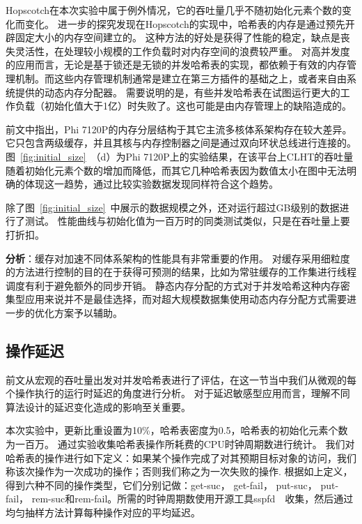 Hopscotch在本次实验中属于例外情况，它的吞吐量几乎不随初始化元素个数的变化而变化。
进一步的探究发现在Hopscotch的实现中，哈希表的内存是通过预先开辟固定大小的内存空间建立的。
这种方法的好处是获得了性能的稳定，缺点是丧失灵活性，在处理较小规模的工作负载时对内存空间的浪费较严重。
对高并发度的应用而言，无论是基于锁还是无锁的并发哈希表的实现，都依赖于有效的内存管理机制。而这些内存管理机制通常是建立在第三方插件的基础之上，或者来自由系统提供的动态内存分配器。
需要说明的是，有些并发哈希表在试图运行更大的工作负载（初始化值大于1亿）时失败了。这也可能是由内存管理上的缺陷造成的。

前文中指出，Phi 7120P的内存分层结构于其它主流多核体系架构存在较大差异。
它只包含两级缓存，并且其核与内存控制器之间是通过双向环状总线进行连接的。图~\ref{fig:initial_size}~（d）为Phi 7120P上的实验结果，在该平台上CLHT的吞吐量随着初始化元素个数的增加而降低，而其它几种哈希表因为数值太小在图中无法明确的体现这一趋势，通过比较实验数据发现同样符合这个趋势。

除了图~\ref{fig:initial_size}~中展示的数据规模之外，还对运行超过GB级别的数据进行了测试。
性能曲线与初始化值为一百万时的同类测试类似，只是在吞吐量上要打折扣。

\textbf{分析}：缓存对加速不同体系架构的性能具有非常重要的作用。
对缓存采用细粒度的方法进行控制的目的在于获得可预测的结果，比如为常驻缓存的工作集进行线程调度有利于避免额外的同步开销。
静态内存分配的方式对于并发哈希这种内存密集型应用来说并不是最佳选择，而对超大规模数据集使用动态内存分配方式需要进一步的优化方案予以辅助。

\subsection{操作延迟}
\label{sec:latency}
前文从宏观的吞吐量出发对并发哈希表进行了评估，在这一节当中我们从微观的每个操作执行的运行时延迟的角度进行分析。
对于延迟敏感型应用而言，理解不同算法设计的延迟变化造成的影响至关重要。

本次实验中，更新比重设置为10\%，哈希表密度为0.5，哈希表的初始化元素个数为一百万。
通过实验收集哈希表操作所耗费的CPU时钟周期数进行统计。
我们对哈希表的操作进行如下定义：如果某个操作完成了对其预期目标对象的访问，我们称该次操作为一次成功的操作；否则我们称之为一次失败的操作.
根据如上定义，得到六种不同的操作类型，它们分别记做：get-suc， get-fail， put-suc， put-fail， rem-suc和rem-fail。所需的时钟周期数使用开源工具sspfd~\cite{sspfd}~收集，然后通过均匀抽样方法计算每种操作对应的平均延迟。


